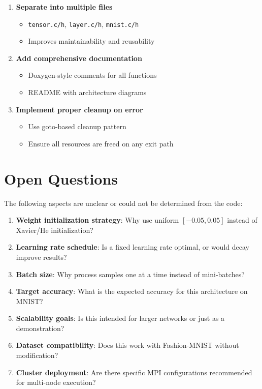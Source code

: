 \documentclass[11pt,a4paper]{article}
\begin{document}
\begin{enumerate}
    \item \textbf{Separate into multiple files}
    \begin{itemize}
        \item \texttt{tensor.c/h}, \texttt{layer.c/h}, \texttt{mnist.c/h}
        \item Improves maintainability and reusability
    \end{itemize}
    
    \item \textbf{Add comprehensive documentation}
    \begin{itemize}
        \item Doxygen-style comments for all functions
        \item README with architecture diagrams
    \end{itemize}
    
    \item \textbf{Implement proper cleanup on error}
    \begin{itemize}
        \item Use goto-based cleanup pattern
        \item Ensure all resources are freed on any exit path
    \end{itemize}
\end{enumerate}

\section{Open Questions}

The following aspects are unclear or could not be determined from the code:

\begin{enumerate}
    \item \textbf{Weight initialization strategy}: Why use uniform $[-0.05, 0.05]$ instead of Xavier/He initialization?
    
    \item \textbf{Learning rate schedule}: Is a fixed learning rate optimal, or would decay improve results?
    
    \item \textbf{Batch size}: Why process samples one at a time instead of mini-batches?
    
    \item \textbf{Target accuracy}: What is the expected accuracy for this architecture on MNIST?
    
    \item \textbf{Scalability goals}: Is this intended for larger networks or just as a demonstration?
    
    \item \textbf{Dataset compatibility}: Does this work with Fashion-MNIST without modification?
    
    \item \textbf{Cluster deployment}: Are there specific MPI configurations recommended for multi-node execution?
\end{enumerate}
\end{document}
